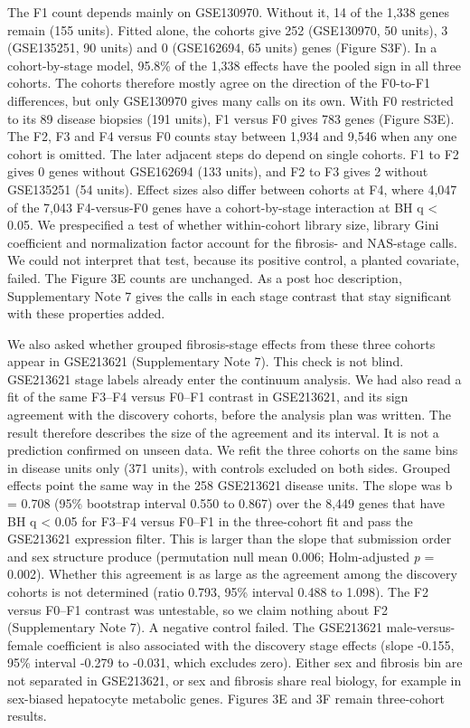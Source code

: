 The F1 count depends mainly on GSE130970. Without it, 14 of the 1,338 genes remain (155 units). Fitted alone, the cohorts give 252 (GSE130970, 50 units), 3 (GSE135251, 90 units) and 0 (GSE162694, 65 units) genes (Figure S3F). In a cohort-by-stage model, 95.8\% of the 1,338 effects have the pooled sign in all three cohorts. The cohorts therefore mostly agree on the direction of the F0-to-F1 differences, but only GSE130970 gives many calls on its own. With F0 restricted to its 89 disease biopsies (191 units), F1 versus F0 gives 783 genes (Figure S3E). The F2, F3 and F4 versus F0 counts stay between 1,934 and 9,546 when any one cohort is omitted. The later adjacent steps do depend on single cohorts. F1 to F2 gives 0 genes without GSE162694 (133 units), and F2 to F3 gives 2 without GSE135251 (54 units). Effect sizes also differ between cohorts at F4, where 4,047 of the 7,043 F4-versus-F0 genes have a cohort-by-stage interaction at BH q \textless{} 0.05. We prespecified a test of whether within-cohort library size, library Gini coefficient and normalization factor account for the fibrosis- and NAS-stage calls. We could not interpret that test, because its positive control, a planted covariate, failed. The Figure 3E counts are unchanged. As a post hoc description, Supplementary Note 7 gives the calls in each stage contrast that stay significant with these properties added.

We also asked whether grouped fibrosis-stage effects from these three cohorts appear in GSE213621 (Supplementary Note 7). This check is not blind. GSE213621 stage labels already enter the continuum analysis. We had also read a fit of the same F3--F4 versus F0--F1 contrast in GSE213621, and its sign agreement with the discovery cohorts, before the analysis plan was written. The result therefore describes the size of the agreement and its interval. It is not a prediction confirmed on unseen data. We refit the three cohorts on the same bins in disease units only (371 units), with controls excluded on both sides. Grouped effects point the same way in the 258 GSE213621 disease units. The slope was b = 0.708 (95\% bootstrap interval 0.550 to 0.867) over the 8,449 genes that have BH q \textless{} 0.05 for F3--F4 versus F0--F1 in the three-cohort fit and pass the GSE213621 expression filter. This is larger than the slope that submission order and sex structure produce (permutation null mean 0.006; Holm-adjusted \emph{p} = 0.002). Whether this agreement is as large as the agreement among the discovery cohorts is not determined (ratio 0.793, 95\% interval 0.488 to 1.098). The F2 versus F0--F1 contrast was untestable, so we claim nothing about F2 (Supplementary Note 7). A negative control failed. The GSE213621 male-versus-female coefficient is also associated with the discovery stage effects (slope -0.155, 95\% interval -0.279 to -0.031, which excludes zero). Either sex and fibrosis bin are not separated in GSE213621, or sex and fibrosis share real biology, for example in sex-biased hepatocyte metabolic genes. Figures 3E and 3F remain three-cohort results.

